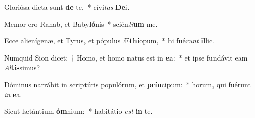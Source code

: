 \item Gloriósa dicta sunt \textbf{de} te,~* cívi\textit{tas} \textbf{De}i.
\item Memor ero Rahab, et Baby\textbf{ló}nis~* scién\textit{ti}\textbf{um} me.
\item Ecce alienígenæ, et Tyrus, et pópulus Æ\textbf{thí}opum,~* hi fué\textit{runt} \textbf{il}lic.
\item Numquid Sion dicet:~† Homo, et homo natus est in \textbf{e}a:~* et ipse fundávit eam \textit{Al}\textbf{tís}simus?
\item Dóminus narrábit in scriptúris populórum, et \textbf{prín}cipum:~* horum, qui fuérunt \textit{in} \textbf{e}a.
\item Sicut lætántium \textbf{óm}nium:~* habitátio \textit{est} \textbf{in} te.
